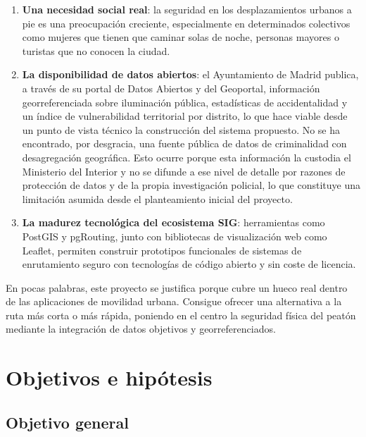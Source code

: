 \begin{enumerate}
    \item \textbf{Una necesidad social real}: la seguridad en los desplazamientos urbanos a pie es una preocupación creciente, especialmente en determinados colectivos como mujeres que tienen que caminar solas de noche, personas mayores o turistas que no conocen la ciudad.
    \item \textbf{La disponibilidad de datos abiertos}: el Ayuntamiento de Madrid publica, a través de su portal de Datos Abiertos y del Geoportal, información georreferenciada sobre iluminación pública, estadísticas de accidentalidad y un índice de vulnerabilidad territorial por distrito, lo que hace viable desde un punto de vista técnico la construcción del sistema propuesto. No se ha encontrado, por desgracia, una fuente pública de datos de criminalidad con desagregación geográfica. Esto ocurre porque esta información la custodia el Ministerio del Interior y no se difunde a ese nivel de detalle por razones de protección de datos y de la propia investigación policial, lo que constituye una limitación asumida desde el planteamiento inicial del proyecto.
    \item \textbf{La madurez tecnológica del ecosistema SIG}: herramientas como PostGIS y pgRouting, junto con bibliotecas de visualización web como Leaflet, permiten construir prototipos funcionales de sistemas de enrutamiento seguro con tecnologías de código abierto y sin coste de licencia.
\end{enumerate}

En pocas palabras, este proyecto se justifica porque cubre un hueco real dentro de las aplicaciones de movilidad urbana. Consigue ofrecer una alternativa a la ruta más corta o más rápida, poniendo en el centro la seguridad física del peatón mediante la integración de datos objetivos y georreferenciados.

\section{Objetivos e hipótesis}
\label{sec:objetivos}

\subsection{Objetivo general}
\label{subsec:objetivo_general}

